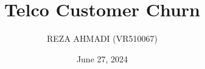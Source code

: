 \documentclass{article}
\begin{document}
\setcounter{section}{-1}

\title{Telco Customer Churn}
\author{REZA AHMADI (VR510067)}
\date{June 27, 2024}

\maketitle

\newpage

\tableofcontents
\end{document}
